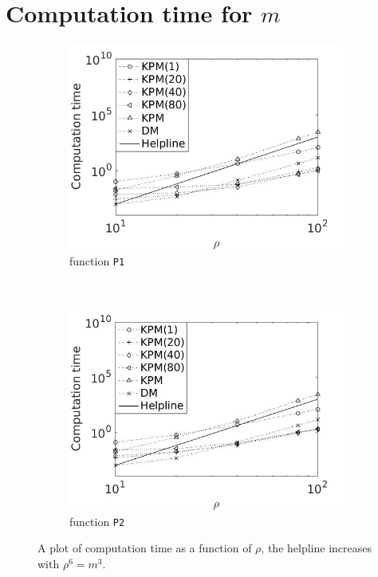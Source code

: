 \section{Computation time for $m$} \label{sec:stimem}
\begin{figure}[H]
        \centering
        \begin{subfigure}[b]{0.45\textwidth}
                \includegraphics[width=\textwidth]{fig/n5timevsm1}
                \caption{function \texttt{P1}}
                \label{fig:timem1}
        \end{subfigure}%
        ~
        \begin{subfigure}[b]{0.45\textwidth}
                \includegraphics[width=\textwidth]{fig/n6timevsm2}
                \caption{function \texttt{P2}}
                \label{fig:timem2}
        \end{subfigure}
        \caption{A plot of computation time as a function of $\rho$, the helpline increases with $\rho^6 = m^3$.}\label{fig:timem}
\end{figure}
